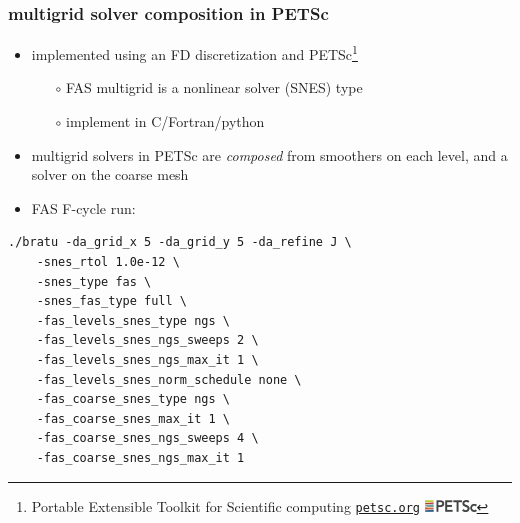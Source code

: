 \documentclass[svgnames,
               hyperref={colorlinks,citecolor=DeepPink4,linkcolor=FireBrick,urlcolor=Maroon},
               usepdftitle=false]  %
               {beamer}
\begin{document}
\begin{frame}[fragile]
\frametitle{multigrid solver composition in PETSc}

\begin{itemize}
\item implemented using an FD discretization and PETSc\footnote{Portable Extensible Toolkit for Scientific computing \quad \href{https://petsc.org/release/}{\texttt{petsc.org}} \quad \includegraphics[height=3mm]{images/petsc.png}}
    \begin{itemize}
    \item[$\circ$] FAS multigrid is a nonlinear solver (SNES) type
    \item[$\circ$] implement in C/Fortran/python
    \end{itemize}
\item multigrid solvers in PETSc are \emph{composed} from smoothers on each level, and a solver on the coarse mesh
\item FAS F-cycle run:
\end{itemize}
\begin{Verbatim}[xleftmargin=15mm,fontsize=\scriptsize]
./bratu -da_grid_x 5 -da_grid_y 5 -da_refine J \
    -snes_rtol 1.0e-12 \
    -snes_type fas \
    -snes_fas_type full \
    -fas_levels_snes_type ngs \
    -fas_levels_snes_ngs_sweeps 2 \
    -fas_levels_snes_ngs_max_it 1 \
    -fas_levels_snes_norm_schedule none \
    -fas_coarse_snes_type ngs \
    -fas_coarse_snes_max_it 1 \
    -fas_coarse_snes_ngs_sweeps 4 \
    -fas_coarse_snes_ngs_max_it 1 
\end{Verbatim}

\end{frame}
\end{document}
